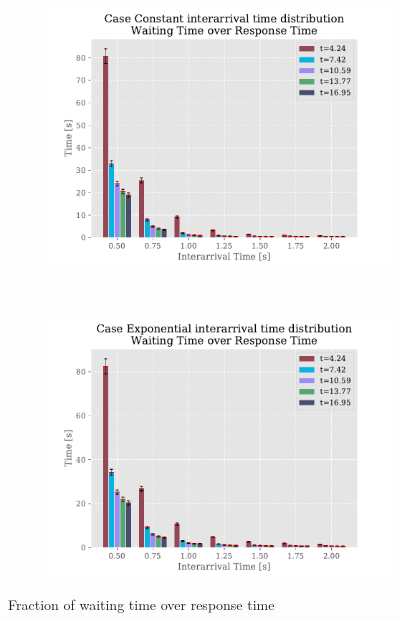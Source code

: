 \documentclass[a4paper,12pt]{article}
\begin{document}
\begin{figure}
  \centering
  \begin{subfigure}[b]{.45\textwidth}
    \includegraphics[width=\textwidth]{img/WaitingTimeOverResponseTimeP2Const.pdf}
    \label{fig:exp:const:wor}
  \end{subfigure}
  ~
  \begin{subfigure}[b]{.45\textwidth}
    \includegraphics[width=\textwidth]{img/WaitingTimeOverResponseTimeP2Exp.pdf}
    \label{fig:exp:exp:wor}
  \end{subfigure}
  \caption{Fraction of waiting time over response time}
  \label{fig:result-1}
\end{figure}
\end{document}

